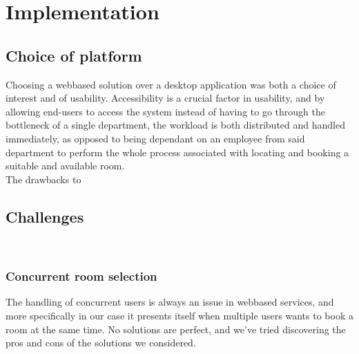 \chapter{Implementation}

\section{Choice of platform}
Choosing a webbased solution over a desktop application was both a choice of interest and of usability. Accessibility is a crucial factor in usability, and by allowing end-users to access the system instead of having to go through the bottleneck of a single department, the workload is both distributed and handled immediately, as opposed to being dependant on an employee from said department to perform the whole process associated with locating and booking a suitable and available room.
\\
The drawbacks to 


\section{Challenges}
\label{sec:challenges}
\\
\subsection{Concurrent room selection}
The handling of concurrent users is always an issue in webbased services, and more specifically in our case it presents itself when multiple users wants to book a room at the same time. No solutions are perfect, and we've tried discovering the pros and cons of the solutions we considered.

